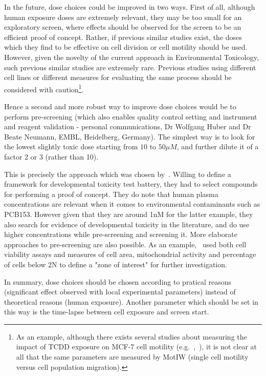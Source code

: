 In the future, dose choices could be improved in two ways. First of all, although human exposure doses are extremely relevant, they may be too small for an exploratory screen, where effects should be observed for the screen to be an efficient proof of concept. Rather, if previous similar studies exist, the doses which they find to be effective on cell division or cell motility should be used. However, given the novelty of the current approach in Environmental Toxicology, such previous similar studies are extremely rare. Previous studies using different cell lines or different measures for evaluating the same process should be considered with caution\footnote{As an example, although there exists several studies about measuring the impact of TCDD exposure on MCF-7 cell motility (e.g.~\cite{pmid16619036},~\cite{pmid22266097}), it is not clear at all that the same parameters are measured by MotIW (single cell motility versus cell population migration).}.

Hence a second and more robust way to improve dose choices would be to perform pre-screening (which also enables quality control setting and instrument and reagent validation - personal communications, Dr Wolfgang Huber and Dr Beate Neumann, EMBL, Heidelberg, Germany). The simplest way is to look for the lowest slightly toxic dose starting from $10$ to $50 \mu M$, and further dilute it of a factor 2 or 3 (rather than 10). 

This is precisely the approach which was chosen by~\cite{pmid24691702}. Willing to define a framework for developmental toxicity test battery, they had to select compounds for performing a proof of concept. They do note that human plasma concentrations are relevant when it comes to environmental contaminants such as PCB153. However given that they are around 1nM for the latter example, they also search for evidence of developmental toxicity in the literature, and do use higher concentrations while pre-screening and screening it. More elaborate approaches to pre-screening are also possible. As an example,~\cite{pmid24997295} used both cell viability assays and measures of cell area, mitochondrial activity and percentage of cells below 2N to define a "zone of interest" for further investigation.

In summary, dose choices should be chosen according to pratical reasons (significant effect observed with local experimental parameters) instead of theoretical reasons (human exposure). Another parameter which should be set in this way is the time-lapse between cell exposure and screen start.

